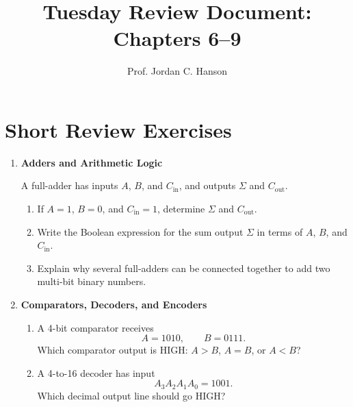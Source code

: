\documentclass{article}
\begin{document}
\twocolumn

\title{Tuesday Review Document: Chapters 6--9}
\author{Prof. Jordan C. Hanson}
\date{}

\maketitle

\section*{Short Review Exercises}

\begin{enumerate}

\item \textbf{Adders and Arithmetic Logic}

A full-adder has inputs $A$, $B$, and $C_{\mathrm{in}}$, and outputs
$\Sigma$ and $C_{\mathrm{out}}$.

\begin{enumerate}
\item If $A=1$, $B=0$, and $C_{\mathrm{in}}=1$, determine
$\Sigma$ and $C_{\mathrm{out}}$.

\vspace{0.8cm}

\item Write the Boolean expression for the sum output $\Sigma$ in
terms of $A$, $B$, and $C_{\mathrm{in}}$.

\vspace{0.8cm}

\item Explain why several full-adders can be connected together to
add two multi-bit binary numbers.

\vspace{1.0cm}
\end{enumerate}

\item \textbf{Comparators, Decoders, and Encoders}

\begin{enumerate}
\item A 4-bit comparator receives
\[
A=1010, \qquad B=0111.
\]
Which comparator output is HIGH: $A>B$, $A=B$, or $A<B$?

\vspace{0.7cm}

\item A 4-to-16 decoder has input
\[
A_3A_2A_1A_0=1001.
\]
Which decimal output line should go HIGH?


\end{enumerate}
\end{enumerate}
\end{document}
